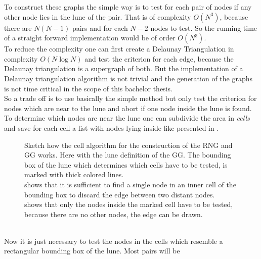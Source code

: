     To construct these graphs the simple way is to test for each
    pair of nodes if any other node lies in
    the lune of the pair. That is of complexity \(O (N^3)\), because
    there are \(N(N-1)\) pairs and for each \(N-2\) nodes to test. So
    the running time of a straight forward implementation would be of
    order \(O(N^3)\).\\
    To reduce the complexity one can first create a Delaunay
    Triangulation in complexity \(O (N \log N)\)
    \cite{RNGCell} and test the criterion for each edge, because
    the Delaunay triangulation is a supergraph of both. But the
    implementation of a Delaunay triangulation algorithm is not trivial
    and the generation of the graphs is not time critical in the scope
    of this bachelor thesis.\\
    So a trade off is to use basically the simple method but only test
    the criterion for nodes which are near to the lune and abort if
    one node inside the lune is found. To determine which nodes are
    near the lune one can subdivide the area in \emph{cells} and save
    for each cell a list with nodes lying inside like presented in
    \cite{RNGCell}.\\
    \begin{figure}[htbp]
        \centering
        \caption[Sketch how the Cell Method Works]
        {
            Sketch how the cell algorithm for the construction of the
            RNG and GG works. Here with the lune definition of the GG.
            The bounding box of the lune which determines which cells have
            to be tested, is marked with thick colored lines.\\
             shows that it is sufficient to find a
            single node in an inner cell of the bounding box to discard
            the edge between two distant nodes.\\
             shows that only the nodes inside the
            marked cell have to be tested, because there are no other nodes,
            the edge can be drawn.
        }
        \label{fig:cell}
    \end{figure}\\
    Now it is just necessary to test the nodes in the cells which
    resemble a rectangular bounding box of the lune. Most pairs will be

